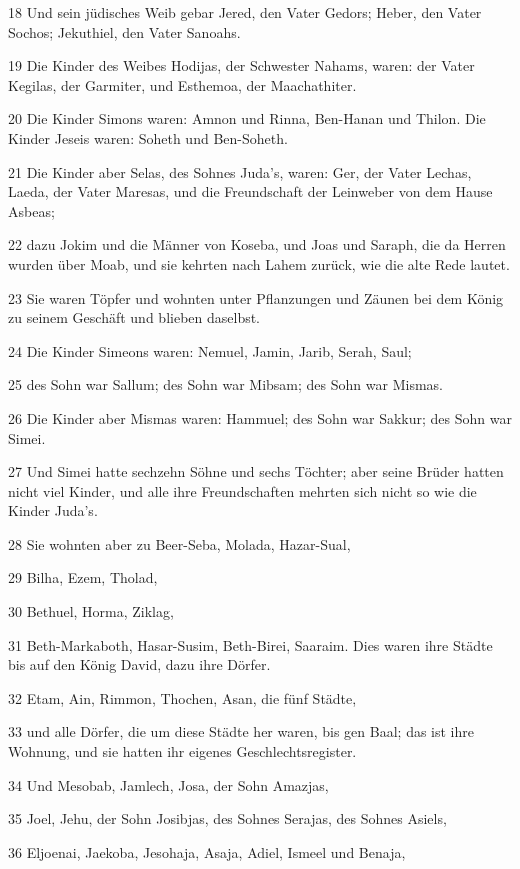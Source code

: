 \par 18 Und sein jüdisches Weib gebar Jered, den Vater Gedors; Heber, den Vater Sochos; Jekuthiel, den Vater Sanoahs.
\par 19 Die Kinder des Weibes Hodijas, der Schwester Nahams, waren: der Vater Kegilas, der Garmiter, und Esthemoa, der Maachathiter.
\par 20 Die Kinder Simons waren: Amnon und Rinna, Ben-Hanan und Thilon. Die Kinder Jeseis waren: Soheth und Ben-Soheth.
\par 21 Die Kinder aber Selas, des Sohnes Juda's, waren: Ger, der Vater Lechas, Laeda, der Vater Maresas, und die Freundschaft der Leinweber von dem Hause Asbeas;
\par 22 dazu Jokim und die Männer von Koseba, und Joas und Saraph, die da Herren wurden über Moab, und sie kehrten nach Lahem zurück, wie die alte Rede lautet.
\par 23 Sie waren Töpfer und wohnten unter Pflanzungen und Zäunen bei dem König zu seinem Geschäft und blieben daselbst.
\par 24 Die Kinder Simeons waren: Nemuel, Jamin, Jarib, Serah, Saul;
\par 25 des Sohn war Sallum; des Sohn war Mibsam; des Sohn war Mismas.
\par 26 Die Kinder aber Mismas waren: Hammuel; des Sohn war Sakkur; des Sohn war Simei.
\par 27 Und Simei hatte sechzehn Söhne und sechs Töchter; aber seine Brüder hatten nicht viel Kinder, und alle ihre Freundschaften mehrten sich nicht so wie die Kinder Juda's.
\par 28 Sie wohnten aber zu Beer-Seba, Molada, Hazar-Sual,
\par 29 Bilha, Ezem, Tholad,
\par 30 Bethuel, Horma, Ziklag,
\par 31 Beth-Markaboth, Hasar-Susim, Beth-Birei, Saaraim. Dies waren ihre Städte bis auf den König David, dazu ihre Dörfer.
\par 32 Etam, Ain, Rimmon, Thochen, Asan, die fünf Städte,
\par 33 und alle Dörfer, die um diese Städte her waren, bis gen Baal; das ist ihre Wohnung, und sie hatten ihr eigenes Geschlechtsregister.
\par 34 Und Mesobab, Jamlech, Josa, der Sohn Amazjas,
\par 35 Joel, Jehu, der Sohn Josibjas, des Sohnes Serajas, des Sohnes Asiels,
\par 36 Eljoenai, Jaekoba, Jesohaja, Asaja, Adiel, Ismeel und Benaja,
